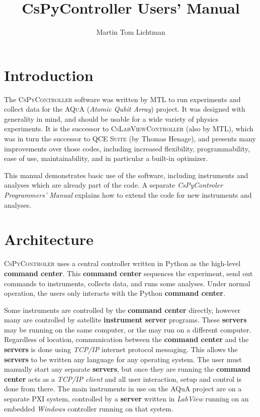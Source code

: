 \documentclass[pdftex,11pt,letterpaper]{article}
\title{CsPyController Users' Manual}
\author{Martin Tom Lichtman}
\begin{document}
\maketitle

\tableofcontents
\section{Introduction}
The \textsc{CsPyController} software was written by MTL to run experiments and collect data for the \textsc{AQuA} (\textit{Atomic Qubit Array}) project.  It was designed with generality in mind, and should be usable for a wide variety of physics experiments.  It is the successor to \textsc{CsLabViewController} (also by MTL), which was in turn the successor to \textsc{QCE Suite} (by Thomas Henage), and presents many improvements over those codes, including increased flexibility, programmability, ease of use, maintainability, and in particular a built-in optimizer.

This manual demonstrates basic use of the software, including instruments and analyses which are already part of the code.  A separate \textit{CsPyControler Programmers' Manual} explains how to extend the code for new instruments and analyses.

\section{Architecture}
\textsc{CsPyControler} uses a central controller written in Python as the high-level \textbf{command center}.  This \textbf{command center} sequences the experiment, send out commands to instruments, collects data, and runs some analyses.  Under normal operation, the users only interacts with the Python \textbf{command center}.

Some instruments are controlled by the \textbf{command center} directly, however many are controlled by satellite \textbf{instrument server} programs.  These \textbf{servers} may be running on the same computer, or the may run on a different computer.  Regardless of location, communication between the \textbf{command center} and the \textbf{servers} is done using \textit{TCP/IP} internet protocol messaging.  This allows the \textbf{servers} to be written any language for any operating system.  The user must manually start any separate \textbf{servers}, but once they are running the \textbf{command center} acts as a \textit{TCP/IP client} and all user interaction, setup and control is done from there.  The main instruments in use on the AQuA project are on a separate PXI system, controlled by a \textbf{server} written in \textit{LabView} running on an embedded \textit{Windows} controller running on that system.
\end{document}
